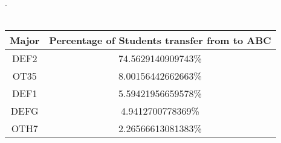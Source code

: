 . \\ \\
\begin{center}
\begin{tabular}{|c|c|}
\hline
Major & Percentage of Students transfer from to ABC \\ \hline
DEF2    & 74.5629140909743\%                                      \\ \hline
OT35    & 8.00156442662663\%                                       \\ \hline
DEF1     & 5.59421956659578\%                                      \\ \hline
DEFG   & 4.9412700778369\%                                     \\ \hline
OTH7     &2.26566613081383\%                                      \\ \hline

\end{tabular}
\end{center}
